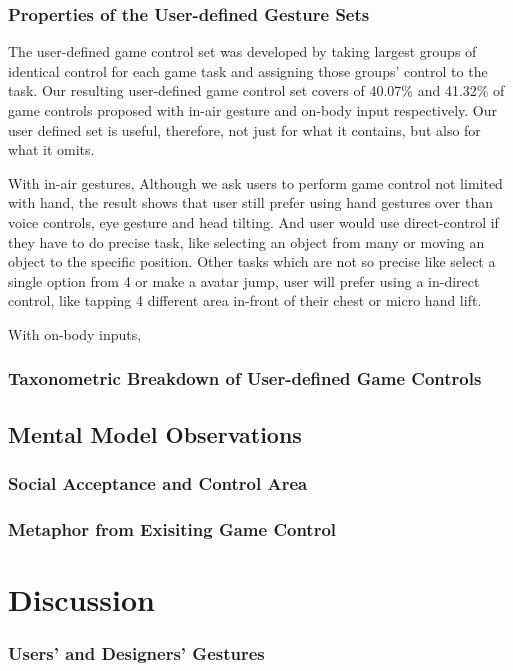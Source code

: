 \documentclass{sigchi}
\begin{document}
   \subsubsection{Properties of the User-defined Gesture Sets}
   The user-defined game control set was developed by taking largest groups of identical control for each game task and assigning those groups' control to the task. 
   Our resulting user-defined game control set covers of 40.07\% and 41.32\% of game controls proposed with in-air gesture and on-body input respectively. Our user defined set is useful, therefore, not just for what it contains, but also for what it omits.

   With in-air gestures, Although we ask users to perform game control not limited with hand, the result shows that user still prefer using hand gestures over than voice controls, eye gesture and head tilting. And user would use direct-control if they have to do precise task, like selecting an object from many or moving an object to the specific position. Other tasks which are not so precise like select a single option from 4 or make a avatar jump, user will prefer using a in-direct control, like tapping 4 different area in-front of their chest or micro hand lift.

   With on-body inputs,



   \subsubsection{Taxonometric Breakdown of User-defined Game Controls}

  \subsection{Mental Model Observations}
    \subsubsection{Social Acceptance and Control Area}
    \subsubsection{Metaphor from Exisiting Game Control}

  \section{Discussion}
    \subsubsection{Users' and Designers' Gestures}
\end{document}
